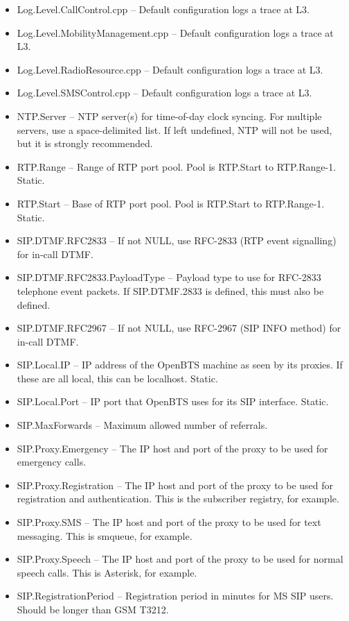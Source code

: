 \documentclass[11pt,openany]{book}
\begin{document}
\begin{itemize}
\item Log.Level.CallControl.cpp -- Default configuration logs a trace at L3.
\item Log.Level.MobilityManagement.cpp -- Default configuration logs a trace at L3.
\item Log.Level.RadioResource.cpp -- Default configuration logs a trace at L3.
\item Log.Level.SMSControl.cpp -- Default configuration logs a trace at L3.
\item NTP.Server -- NTP server(s) for time-of-day clock syncing.  For multiple servers, use a space-delimited list.  If left undefined, NTP will not be used, but it is strongly recommended.
\item RTP.Range -- Range of RTP port pool.  Pool is RTP.Start to RTP.Range-1.  Static.
\item RTP.Start -- Base of RTP port pool.  Pool is RTP.Start to RTP.Range-1.  Static.
\item SIP.DTMF.RFC2833 -- If not NULL, use RFC-2833 (RTP event signalling) for in-call DTMF.
\item SIP.DTMF.RFC2833.PayloadType -- Payload type to use for RFC-2833 telephone event packets.  If SIP.DTMF.2833 is defined, this must also be defined.
\item SIP.DTMF.RFC2967 -- If not NULL, use RFC-2967 (SIP INFO method) for in-call DTMF.
\item SIP.Local.IP -- IP address of the OpenBTS machine as seen by its proxies.  If these are all local, this can be localhost.  Static.
\item SIP.Local.Port -- IP port that OpenBTS uses for its SIP interface.  Static.
\item SIP.MaxForwards -- Maximum allowed number of referrals.
\item SIP.Proxy.Emergency -- The IP host and port of the proxy to be used for emergency calls.
\item SIP.Proxy.Registration -- The IP host and port of the proxy to be used for registration and authentication.  This is the subscriber registry, for example.
\item SIP.Proxy.SMS -- The IP host and port of the proxy to be used for text messaging.  This is smqueue, for example.
\item SIP.Proxy.Speech -- The IP host and port of the proxy to be used for normal speech calls.  This is Asterisk, for example.
\item SIP.RegistrationPeriod -- Registration period in minutes for MS SIP users.  Should be longer than GSM T3212.

\end{itemize}
\end{document}
